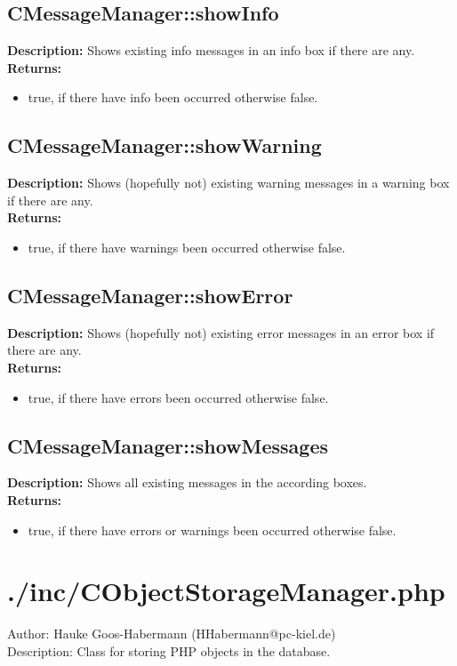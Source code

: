 \subsection{CMessageManager::showInfo}
\textbf{Description:} Shows existing info messages in an info box if there are any.\\
\textbf{Returns:}
\begin{itemize}
\item true, if there have info been occurred otherwise false.
\end{itemize}

\subsection{CMessageManager::showWarning}
\textbf{Description:} Shows (hopefully not) existing warning messages in a warning box if there are any.\\
\textbf{Returns:}
\begin{itemize}
\item true, if there have warnings been occurred otherwise false.
\end{itemize}

\subsection{CMessageManager::showError}
\textbf{Description:} Shows (hopefully not) existing error messages in an error box if there are any.\\
\textbf{Returns:}
\begin{itemize}
\item true, if there have errors been occurred otherwise false.
\end{itemize}

\subsection{CMessageManager::showMessages}
\textbf{Description:} Shows all existing messages in the according boxes.\\
\textbf{Returns:}
\begin{itemize}
\item true, if there have errors or warnings been occurred otherwise false.
\end{itemize}

\newpage\section{./inc/CObjectStorageManager.php}
 Author: Hauke Goos-Habermann (HHabermann@pc-kiel.de)\\
 Description: Class for storing PHP objects in the database.\\

